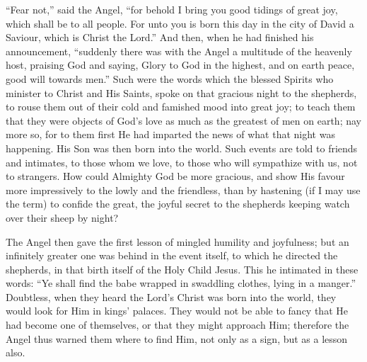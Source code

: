 ``Fear not,'' said the Angel, ``for behold I bring you
good tidings of great joy, which shall be to all people. For unto you
is born this day in the city of David a Saviour, which is Christ the
Lord.'' And then, when he had finished his announcement,
``suddenly there was with the Angel a multitude of the heavenly
host, praising God and saying, Glory to God in the highest, and on
earth peace, good will towards men.'' Such were the words which
the blessed Spirits who minister to Christ and His Saints, spoke on
that gracious night to the shepherds, to rouse them out of their cold
and famished mood into great joy; to teach them that they were objects
of God's love as much as the greatest of men on earth; nay more so,
for to them first He had imparted the news of what that night was
happening. His Son was then born into the world. Such events are told
to friends and intimates, to those whom we love, to those who will
sympathize with us, not to strangers. How could Almighty God be more
gracious, and show His favour more impressively to the lowly and the
friendless, than by hastening (if I may use the term) to confide the
great, the joyful secret to the shepherds keeping watch over their
sheep by night?

The Angel then gave the first lesson of mingled humility and
joyfulness; but an infinitely greater one was behind in the event
itself, to which he directed the shepherds, in that birth itself of
the Holy Child Jesus. This he intimated in these words: ``Ye shall
find the babe wrapped in swaddling clothes, lying in a manger.''
Doubtless, when they heard the Lord's Christ was born into the world,
they would look for Him in kings' palaces. They would not be able to
fancy that He had become one of themselves, or that they might
approach Him; therefore the Angel thus warned them where to find Him,
not only as a sign, but as a lesson also.


